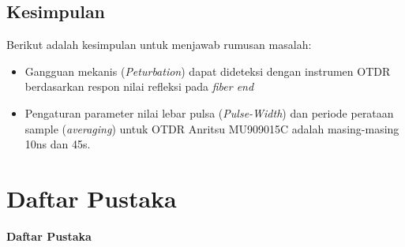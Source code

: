 \documentclass[12pt]{article}
\begin{document}
\subsection{Kesimpulan}

Berikut adalah kesimpulan untuk menjawab rumusan masalah:

\begin{itemize}
	\item Gangguan mekanis (\textit{Peturbation}) dapat dideteksi dengan instrumen OTDR berdasarkan respon nilai refleksi pada \textit{fiber end}
	\item Pengaturan parameter nilai lebar pulsa (\textit{Pulse-Width}) dan periode perataan sample (\textit{averaging}) untuk OTDR Anritsu MU909015C adalah masing-masing 10ns dan 45s.
\end{itemize}
	



\newpage

	\section{Daftar Pustaka}
	
	\begin{center}
		\textbf{Daftar Pustaka}
	\end{center}
	
	
	

	
\end{document}
